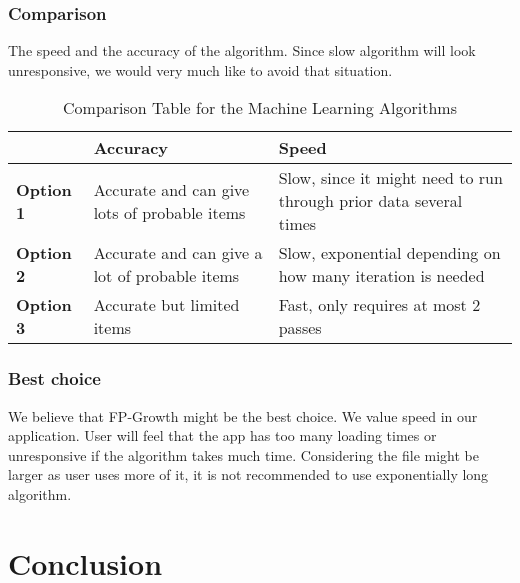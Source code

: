 \documentclass[journal,compsoc, 10pt, draftclsnofoot, onecolumn]{IEEEtran}
\begin{document}
\subsubsection{Comparison}
The speed and the accuracy of the algorithm. Since slow algorithm will look unresponsive, we would very much like to avoid that situation.

\begin{table}[h]
	\centering
	\caption{Comparison Table for the Machine Learning Algorithms}
	\label{Comparison Table for the Machine Learning Algorithms}
	\begin{tabularx}{\textwidth}{|X|X|X|}
		\hline
		\textbf{}         & \textbf{Accuracy}                & \textbf{Speed} 
		\\ \hline
		\textbf{Option 1} & Accurate and can give lots of probable items & Slow, since it might need to run through prior data several times
		\\ \hline
		\textbf{Option 2} & Accurate and can give a lot of probable items & Slow, exponential depending on how many iteration is needed                                                                                       
		\\ \hline
		\textbf{Option 3} & Accurate but limited items & Fast, only requires at most 2 passes                                                              
		\\ \hline
	\end{tabularx}
\end{table}

\subsubsection{Best choice}
We believe that FP-Growth might be the best choice. We value speed in our application. User will feel that the app has too many loading times or unresponsive if the algorithm takes much time. Considering the file might be larger as user uses more of it, it is not recommended to use exponentially long algorithm.

\section{Conclusion}
\end{document}
